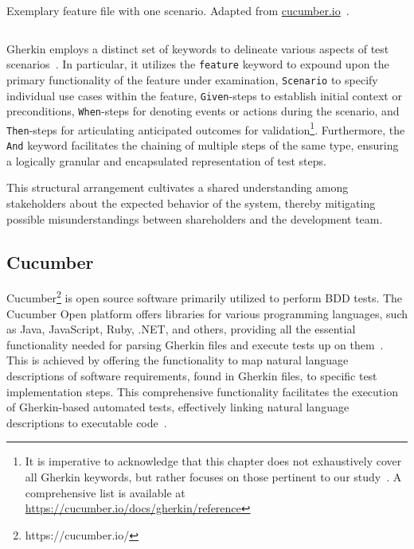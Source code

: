 \begin{listing}[!ht]
\caption{Exemplary feature file with one scenario. Adapted from 
\href{https://cucumber.io/blog/bdd/getting-started-with-bdd-part-1/}{cucumber.io}~\cite{noauthor_getting_nodate}.}
\label{lst:withdrawcash}
\inputminted[linenos, xleftmargin=2em]{gherkin}{files/code/atm.feature}
\end{listing}

Gherkin employs a distinct set of keywords to delineate various aspects of test scenarios~\cite{noauthor_gherkin_nodate}. In particular, it utilizes the \texttt{feature} keyword to expound upon the primary functionality of the feature under examination, \texttt{Scenario} to specify individual use cases within the feature, \texttt{Given}-steps to establish initial context or preconditions, \texttt{When}-steps for denoting events or actions during the scenario, and \texttt{Then}-steps for articulating anticipated outcomes for validation\footnote{It is imperative to acknowledge that this chapter does not exhaustively cover all Gherkin keywords, but rather focuses on those pertinent to our study~\cite{noauthor_gherkin_nodate}. A comprehensive list is available at \href{https://cucumber.io/docs/gherkin/reference/\#keywords}{https://cucumber.io/docs/gherkin/reference}}. Furthermore, the \texttt{And} keyword facilitates the chaining of multiple steps of the same type, ensuring a logically granular and encapsulated representation of test steps. 

This structural arrangement cultivates a shared understanding among stakeholders about the expected behavior of the system, thereby mitigating possible misunderstandings between shareholders and the development team.

\subsection{Cucumber}
\label{subsec:cucumber}
Cucumber\footnote{https://cucumber.io/} is open source software primarily utilized to perform \ac{BDD} tests. The Cucumber Open platform offers libraries for various programming languages, such as Java, JavaScript, Ruby, .NET, and others, providing all the essential functionality needed for parsing Gherkin files and execute tests up on them~\cite{noauthor_cucumber_nodate}. This is achieved by offering the functionality to map natural language descriptions of software requirements, found in Gherkin files, to specific test implementation steps. This comprehensive functionality facilitates the execution of Gherkin-based automated tests, effectively linking natural language descriptions to executable code~\cite{wynne2012cucumber}.

